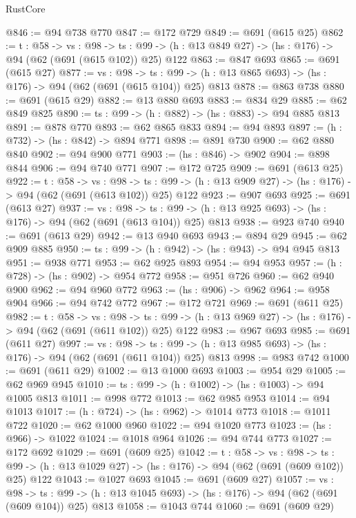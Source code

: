 \begin{lexlean}{RustCore}
\begin{coremodule}
@846 := @94 @738 @770
@847 := @172 @729
@849 := @691 (@615 @25)
@862 := {t : @58} ->
  {vs : @98} ->
  {ts : @99} -> (h : @13 @849 @27) -> (hs : @176) -> @94 (@62 (@691 (@615 @102)) @25) @122
@863 := @847 @693
@865 := @691 (@615 @27)
@877 := {vs : @98} ->
  {ts : @99} -> (h : @13 @865 @693) -> (hs : @176) -> @94 (@62 (@691 (@615 @104)) @25) @813
@878 := @863 @738
@880 := @691 (@615 @29)
@882 := @13 @880 @693
@883 := @834 @29
@885 := @62 @849 @825
@890 := {ts : @99} -> (h : @882) -> (hs : @883) -> @94 @885 @813
@891 := @878 @770
@893 := @62 @865 @833
@894 := @94 @893
@897 := (h : @732) -> (hs : @842) -> @894 @771
@898 := @891 @730
@900 := @62 @880 @840
@902 := @94 @900 @771
@903 := (hs : @846) -> @902
@904 := @898 @844
@906 := @94 @740 @771
@907 := @172 @725
@909 := @691 (@613 @25)
@922 := {t : @58} ->
  {vs : @98} ->
  {ts : @99} -> (h : @13 @909 @27) -> (hs : @176) -> @94 (@62 (@691 (@613 @102)) @25) @122
@923 := @907 @693
@925 := @691 (@613 @27)
@937 := {vs : @98} ->
  {ts : @99} -> (h : @13 @925 @693) -> (hs : @176) -> @94 (@62 (@691 (@613 @104)) @25) @813
@938 := @923 @740
@940 := @691 (@613 @29)
@942 := @13 @940 @693
@943 := @894 @29
@945 := @62 @909 @885
@950 := {ts : @99} -> (h : @942) -> (hs : @943) -> @94 @945 @813
@951 := @938 @771
@953 := @62 @925 @893
@954 := @94 @953
@957 := (h : @728) -> (hs : @902) -> @954 @772
@958 := @951 @726
@960 := @62 @940 @900
@962 := @94 @960 @772
@963 := (hs : @906) -> @962
@964 := @958 @904
@966 := @94 @742 @772
@967 := @172 @721
@969 := @691 (@611 @25)
@982 := {t : @58} ->
  {vs : @98} ->
  {ts : @99} -> (h : @13 @969 @27) -> (hs : @176) -> @94 (@62 (@691 (@611 @102)) @25) @122
@983 := @967 @693
@985 := @691 (@611 @27)
@997 := {vs : @98} ->
  {ts : @99} -> (h : @13 @985 @693) -> (hs : @176) -> @94 (@62 (@691 (@611 @104)) @25) @813
@998 := @983 @742
@1000 := @691 (@611 @29)
@1002 := @13 @1000 @693
@1003 := @954 @29
@1005 := @62 @969 @945
@1010 := {ts : @99} -> (h : @1002) -> (hs : @1003) -> @94 @1005 @813
@1011 := @998 @772
@1013 := @62 @985 @953
@1014 := @94 @1013
@1017 := (h : @724) -> (hs : @962) -> @1014 @773
@1018 := @1011 @722
@1020 := @62 @1000 @960
@1022 := @94 @1020 @773
@1023 := (hs : @966) -> @1022
@1024 := @1018 @964
@1026 := @94 @744 @773
@1027 := @172 @692
@1029 := @691 (@609 @25)
@1042 := {t : @58} ->
  {vs : @98} ->
  {ts : @99} -> (h : @13 @1029 @27) -> (hs : @176) -> @94 (@62 (@691 (@609 @102)) @25) @122
@1043 := @1027 @693
@1045 := @691 (@609 @27)
@1057 := {vs : @98} ->
  {ts : @99} -> (h : @13 @1045 @693) -> (hs : @176) -> @94 (@62 (@691 (@609 @104)) @25) @813
@1058 := @1043 @744
@1060 := @691 (@609 @29)

\end{coremodule}
\end{lexlean}
